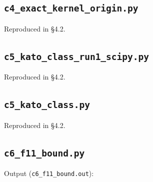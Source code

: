 \documentclass[11pt,a4paper]{article}
\begin{document}
\subsection{\texttt{c4\_exact\_kernel\_origin.py}}
Reproduced in \S4.2.

\subsection{\texttt{c5\_kato\_class\_run1\_scipy.py}}
Reproduced in \S4.2.

\subsection{\texttt{c5\_kato\_class.py}}
Reproduced in \S4.2.

\subsection{\texttt{c6\_f11\_bound.py}}

\noindent Output (\texttt{c6\_f11\_bound.out}):


\nocite{*}


\end{document}
